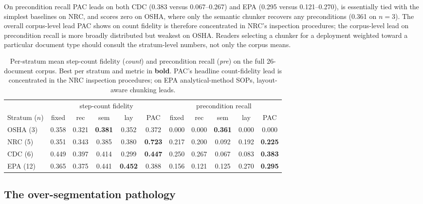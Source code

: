 \documentclass[make,article,submit,oneauthor,pdftex]{Definitions/mdpi}
\begin{document}
On precondition recall PAC leads on both CDC (0.383 versus
0.067--0.267) and EPA (0.295 versus 0.121--0.270), is essentially
tied with the simplest baselines on NRC, and scores zero on OSHA,
where only the semantic chunker recovers any preconditions (0.361 on
$n=3$). The overall corpus-level lead PAC shows on count fidelity is
therefore concentrated in NRC's inspection procedures; the
corpus-level lead on precondition recall is more broadly distributed
but weakest on OSHA. Readers selecting a chunker for a deployment
weighted toward a particular document type should consult the
stratum-level numbers, not only the corpus means.

\begin{table}[ht]
\centering
\caption{Per-stratum mean step-count fidelity (\emph{count}) and
precondition recall (\emph{pre}) on the full 26-document corpus. Best
per stratum and metric in \textbf{bold}. PAC's headline count-fidelity
lead is concentrated in the NRC inspection procedures; on EPA
analytical-method SOPs, layout-aware chunking leads.}
\label{tab:perstratum}
\begin{tabular}{lcccccccccc}
\toprule
& \multicolumn{5}{c}{step-count fidelity}
& \multicolumn{5}{c}{precondition recall} \\
\cmidrule(lr){2-6}\cmidrule(lr){7-11}
Stratum ($n$) & fixed & rec & sem & lay & PAC
              & fixed & rec & sem & lay & PAC \\
\midrule
OSHA (3)
  & 0.358 & 0.321 & \textbf{0.381} & 0.352 & 0.372
  & 0.000 & 0.000 & \textbf{0.361} & 0.000 & 0.000 \\
NRC (5)
  & 0.351 & 0.343 & 0.385 & 0.380 & \textbf{0.723}
  & 0.217 & 0.200 & 0.092 & 0.192 & \textbf{0.225} \\
CDC (6)
  & 0.449 & 0.397 & 0.414 & 0.299 & \textbf{0.447}
  & 0.250 & 0.267 & 0.067 & 0.083 & \textbf{0.383} \\
EPA (12)
  & 0.365 & 0.375 & 0.441 & \textbf{0.452} & 0.388
  & 0.156 & 0.121 & 0.125 & 0.270 & \textbf{0.295} \\
\bottomrule
\end{tabular}
\end{table}

\subsection{The over-segmentation pathology}
\end{document}
